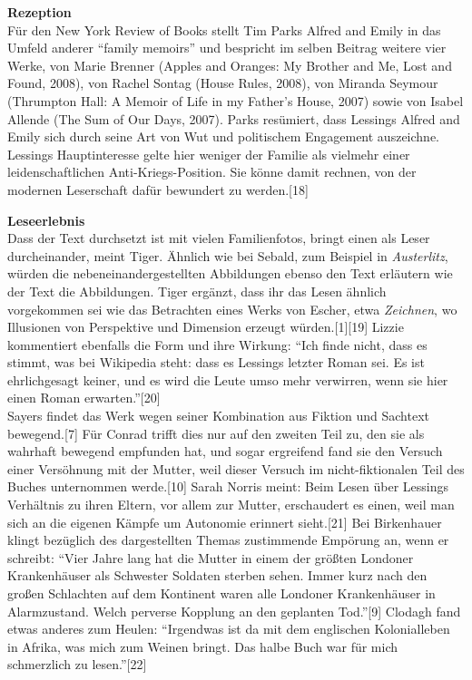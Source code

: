 \documentclass[fontsize=12pt]{scrartcl}
\begin{document}
\textbf{Rezeption}\\
F\"ur den New York Review of Books stellt Tim Parks Alfred and Emily in das Umfeld an\-de\-rer "`family memoirs"' und bespricht im selben Beitrag weitere \mbox{vier} Werke, von Marie Brenner (Apples and Oranges: My Brother and Me, Lost and Found, 2008), von Rachel Sontag (House Rules, 2008), von Miranda Seymour (Thrumpton Hall: A Memoir of Life in my Father's House, 2007) sowie von Isabel Allende (The Sum of Our Days, 2007). Parks res\"umiert, dass Lessings Alfred and Emily sich durch seine Art von Wut und politischem Engagement auszeichne. Lessings Hauptinteresse gelte \mbox{hier} weniger der Familie als vielmehr einer leidenschaftlichen Anti-Kriegs-Position. Sie k\"onne damit rechnen, von der modernen Leserschaft daf\"ur bewundert zu werden.[18]

\textbf{Leseerlebnis}\\
Dass der Text durchsetzt ist mit vielen Familienfotos, bringt einen als Leser durch\-ein\-ander, meint Tiger. \"Ahnlich wie bei Sebald, zum Beispiel in \textit{Austerlitz}, w\"urden die nebeneinandergestellten Abbildungen ebenso den Text erl\"autern wie der Text die Abbildungen. Tiger erg\"anzt, dass ihr das Lesen \"ahnlich vorgekommen sei wie das Betrachten eines Werks von Escher, etwa \textit{Zeichnen}, wo Illusionen von Perspektive und Dimension erzeugt w\"urden.[1][19] Lizzie kommentiert ebenfalls die Form und ihre Wirkung: "`Ich finde nicht, dass es stimmt, was bei Wi\-ki\-pe\-dia steht: dass es Lessings letzter Roman sei. Es ist ehrlichgesagt keiner, und es wird die Leute umso mehr verwirren, wenn sie \mbox{hier} einen Roman erwarten."'[20]\\
Sayers findet das Werk wegen seiner Kombination aus Fiktion und Sachtext bewegend.[7] F\"ur Conrad trifft dies nur auf den zwei\-ten Teil zu, den sie als wahrhaft bewegend empfunden hat, und sogar ergreifend fand sie den Versuch einer Vers\"ohnung mit der Mutter, weil dieser Versuch im nicht-fiktionalen Teil des Buches unternommen werde.[10] Sarah Norris meint: Beim Lesen \"uber Lessings Verh\"altnis zu ihren Eltern, vor allem zur Mutter, erschaudert es einen, weil man sich an die eigenen K\"ampfe um Autonomie erinnert sieht.[21] Bei Birkenhauer klingt bez\"uglich des dargestellten Themas zustimmende Emp\"orung an, wenn er schreibt: "`\mbox{Vier} Jahre lang hat die Mutter in einem der gr\"o{\ss}ten Londoner Krankenh\"auser als Schwes\-ter Sol\-da\-ten sterben sehen. Immer kurz nach den gro{\ss}en Schlachten auf dem Kontinent waren alle Londoner Krankenh\"auser in Alarmzustand. Welch perverse Kopplung an den geplanten Tod."'[9] Clodagh fand etwas anderes zum Heulen: "`Irgendwas ist da mit dem eng\-lischen Kolonialleben in Afrika, was mich zum Weinen bringt. Das halbe Buch war f\"ur mich schmerzlich zu lesen."'[22]\\
\end{document}
